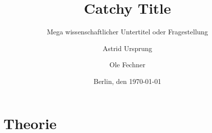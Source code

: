 \documentclass[12pt, titlepage=true, toc=bib]{scrartcl}
\begin{document}
\titlehead{Freie Universität Berlin\\
			FB Politik- und Sozialwissenschaften\\
			Otto-Suhr-Institut\\
			Sommersemester 2016\\
			{[}GEND{]} Rechtsextremismus und Gender: Geschichte und Gegenwart (15095)\\
			Carmen Altmeyer, Till Herold}
\author{Astrid Ursprung\and Ole Fechner}
\title{Catchy Title}
\subtitle{Mega wissenschaftlicher Untertitel oder Fragestellung}
\date{\normalsize{Berlin, den \today}}

\publishers{\normalsize{Goltzstr. 13\hfill Gerichtstr. 13\\
							 10781 Berlin\hfill 13347 Berlin\\
							 ursprung@posteo.de\hfill ole.fechner@fu-berlin.de\\
							 Matrikelnummer: 4768210\hfill Matrikelnummer: 4757766\\
							 BA Politikwissenschaft\hfill BA Politikwissenschaft}}


\maketitle[0]

\newpage
\thispagestyle{empty}
\tableofcontents

\newpage
\setcounter{page}{1}

\section{Theorie}
\end{document}
